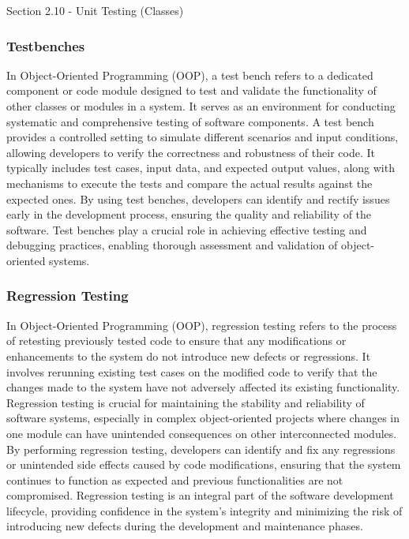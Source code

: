 \begin{notes}{Section 2.10 - Unit Testing (Classes)}
    \subsubsection*{Testbenches}

    In Object-Oriented Programming (OOP), a test bench refers to a dedicated component or code module designed to test and validate the functionality of other classes or modules in a system. It serves as an environment for conducting systematic and comprehensive 
    testing of software components. A test bench provides a controlled setting to simulate different scenarios and input conditions, allowing developers to verify the correctness and robustness of their code. It typically includes test cases, input data, and expected 
    output values, along with mechanisms to execute the tests and compare the actual results against the expected ones. By using test benches, developers can identify and rectify issues early in the development process, ensuring the quality and reliability of the 
    software. Test benches play a crucial role in achieving effective testing and debugging practices, enabling thorough assessment and validation of object-oriented systems.
    
    \subsubsection*{Regression Testing}
    
    In Object-Oriented Programming (OOP), regression testing refers to the process of retesting previously tested code to ensure that any modifications or enhancements to the system do not introduce new defects or regressions. It involves rerunning existing test cases 
    on the modified code to verify that the changes made to the system have not adversely affected its existing functionality. Regression testing is crucial for maintaining the stability and reliability of software systems, especially in complex object-oriented projects 
    where changes in one module can have unintended consequences on other interconnected modules. By performing regression testing, developers can identify and fix any regressions or unintended side effects caused by code modifications, ensuring that the system continues 
    to function as expected and previous functionalities are not compromised. Regression testing is an integral part of the software development lifecycle, providing confidence in the system's integrity and minimizing the risk of introducing new defects during the development 
    and maintenance phases.
    

\end{notes}
